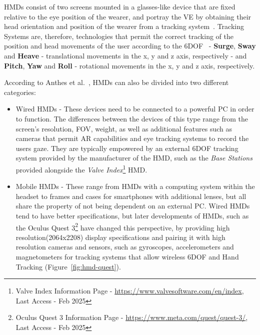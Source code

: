 \glspl{HMD} consist of two screens mounted in a glasses-like device that are fixed relative to
the eye position of the wearer, and portray the \gls{VE} by obtaining their head
orientation and position of the wearer from a tracking system~\cite{Santos2009}. 
Tracking Systems are, therefore, technologies that permit the correct tracking 
of the position and head movements of the user according to the \gls{6DOF}~\cite{Anthes2016} - \textbf{Surge}, \textbf{Sway} and \textbf{Heave} 
- translational movements in the x, y and z axis, respectively 
- and \textbf{Pitch}, \textbf{Yaw} and \textbf{Roll} - rotational movements in the x, y and z axis, respectively.

According to Anthes et al.~\cite{Anthes2016}, \glspl{HMD} can also be divided into two different categories:

\begin{itemize}

    \item Wired \glspl{HMD} - These devices need to be connected to a powerful \gls{PC} in order to function. 
    The differences between the devices of this type range from the screen's resolution, \gls{FOV}, weight, as well as 
    additional features such as cameras that permit \gls{AR} capabilities and eye tracking systems to record the users gaze.
    They are typically empowered by an external \gls{6DOF} tracking system provided by the manufacturer of the \gls{HMD}, such as 
    the \textit{Base Stations} provided alongside the \textit{Valve Index}\footnote{Valve Index Information Page - \href{https://www.valvesoftware.com/en/index}{https://www.valvesoftware.com/en/index}, Last Access - Feb 2025} 
    \gls{HMD}.

    \item Mobile \glspl{HMD} - These range from \glspl{HMD} with a computing system within the headset to frames and cases for 
    smartphones with additional lenses, but all share the property of not being dependent on an external \gls{PC}.
    Wired \glspl{HMD} tend to have better specifications, but later developments of \glspl{HMD}, such as the Oculus Quest 3\footnote{Oculus Quest 3 Information Page - \href{https://www.meta.com/quest/quest-3/}{https://www.meta.com/quest/quest-3/}, Last Access - Feb 2025 } have 
    changed this perspective, by providing high resolution(2064x2208) display specifications and pairing it with high resolution cameras and sensors, such as 
    gyroscopes, accelerometers and magnetometers for tracking systems that allow wireless \gls{6DOF} and Hand Tracking (Figure~\ref{fig:hmd-quest}).
\end{itemize}

